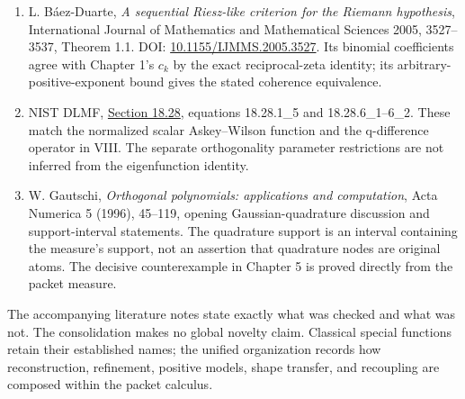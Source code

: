 \begin{enumerate}[leftmargin=*]
\item L. B\'aez-Duarte, \emph{A sequential Riesz-like criterion for the Riemann hypothesis}, International Journal of Mathematics and Mathematical Sciences 2005, 3527--3537, Theorem 1.1. DOI: \href{https://doi.org/10.1155/IJMMS.2005.3527}{10.1155/IJMMS.2005.3527}. Its binomial coefficients agree with Chapter 1's $c_k$ by the exact reciprocal-zeta identity; its arbitrary-positive-exponent bound gives the stated coherence equivalence.
\item NIST DLMF, \href{https://dlmf.nist.gov/18.28}{Section 18.28}, equations 18.28.1\_5 and 18.28.6\_1--6\_2. These match the normalized scalar Askey--Wilson function and the q-difference operator in VIII. The separate orthogonality parameter restrictions are not inferred from the eigenfunction identity.
\item W. Gautschi, \emph{Orthogonal polynomials: applications and computation}, Acta Numerica 5 (1996), 45--119, opening Gaussian-quadrature discussion and support-interval statements. The quadrature support is an interval containing the measure's support, not an assertion that quadrature nodes are original atoms. The decisive counterexample in Chapter 5 is proved directly from the packet measure.
\end{enumerate}

The accompanying literature notes state exactly what was checked and what was not. The consolidation makes no global novelty claim. Classical special functions retain their established names; the unified organization records how reconstruction, refinement, positive models, shape transfer, and recoupling are composed within the packet calculus.
